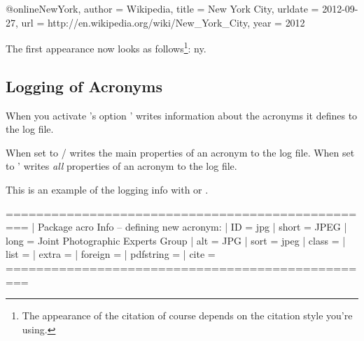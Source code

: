 \documentclass[load-preamble+]{cnltx-doc}
\begin{document}
\begin{sourcecode}[sourcecode-options={style=cnltx-bibtex}]
  @online{NewYork,
    author  = {Wikipedia},
    title   = {New York City},
    urldate = {2012-09-27},
    url     = {http://en.wikipedia.org/wiki/New_York_City},
    year    = {2012}
  }
\end{sourcecode}
The first appearance now looks as follows\footnote{The appearance of the
  citation of course depends on the citation style you're using.}: \acf{ny}.

\subsection{Logging of Acronyms}
When you activate \acro's option  \acro' writes
information about the acronyms it defines to the log file.
\begin{options}
    When set to / \acro{} writes the main properties
    of an acronym to the log file.  When set to  \acro' writes
    \emph{all}  properties of an acronym to the log file.
\end{options}

This is an example of the logging info with  or
.
\begin{sourcecode}
  =================================================
  | Package acro Info -- defining new acronym:
  |   ID = {jpg}
  |   short = {JPEG}
  |   long = {Joint Photographic Experts Group}
  |   alt = {JPG}
  |   sort = {jpeg}
  |   class = {}
  |   list = {}
  |   extra = {}
  |   foreign = {}
  |   pdfstring = {}
  |   cite = {}
  =================================================
\end{sourcecode}
\end{document}
